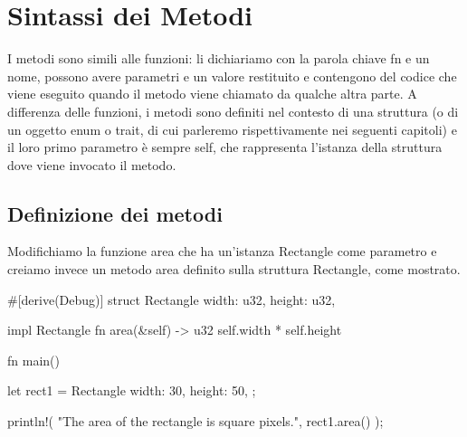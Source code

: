 \documentclass[11pt,a4paper]{article}
\begin{document}
\section{Sintassi dei Metodi}
I metodi sono simili alle funzioni: li dichiariamo con la parola chiave fn e un nome, possono avere parametri e un valore restituito e contengono del codice che viene eseguito quando il metodo viene chiamato da qualche altra parte. A differenza delle funzioni, i metodi sono definiti nel contesto di una struttura (o di un oggetto enum o trait, di cui parleremo rispettivamente nei seguenti capitoli) e il loro primo parametro è sempre self, che rappresenta l'istanza della struttura dove viene invocato il metodo.\\

\subsection{Definizione dei metodi}
Modifichiamo la funzione area che ha un'istanza Rectangle come parametro e creiamo invece un metodo area definito sulla struttura Rectangle, come mostrato.
\begin{rust}
#[derive(Debug)]
struct Rectangle {
    width: u32,
    height: u32,
}

impl Rectangle {
    fn area(&self) -> u32 {
        self.width * self.height
    }
}

fn main() {
    let rect1 = Rectangle {
        width: 30,
        height: 50,
    };

    println!(
        "The area of the rectangle is {} square pixels.",
        rect1.area()
    );
}
\end{rust}
\end{document}
